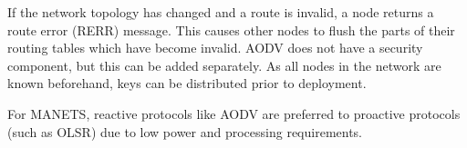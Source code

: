 \documentclass[landscape,a0paper,fontscale=0.285]{baposter} %
\begin{document}
\begin{poster}
{\begin{multicols}{2}
If the network topology has changed and a route is invalid, a node returns a route error (RERR) message. This causes other nodes to flush the parts of their routing tables which have become invalid. AODV does not have a security component, but this can be added separately. As all nodes in the network are known beforehand, keys can be distributed prior to deployment.
\newline

For MANETS, reactive protocols like AODV are preferred to proactive protocols (such as OLSR) due to low power and processing requirements.
\end{multicols}
}








\end{poster}
\end{document}
